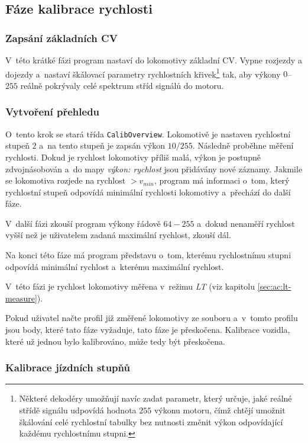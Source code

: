 \subsection{Fáze kalibrace rychlosti}

\subsubsection{Zapsání základních CV}

V~této krátké fázi program nastaví do lokomotivy základní CV. Vypne rozjezdy a
dojezdy a~nastaví škálovací parametry rychlostních křivek\footnote{Některé
dekodéry umožňují navíc zadat parametr, který určuje, jaké reálné střídě
signálu udpovídá hodnota $255$ výkonu motoru, čímž chtějí umožnit
škálování celé rychlostní tabulky bez nutnosti změnit výkon odpovídající
každému rychlostnímu stupni.} tak, aby výkony $0$--$255$ reálně pokrývaly celé
spektrum stříd signálů do motoru.

\subsubsection{Vytvoření přehledu}

O~tento krok se stará třída \texttt{CalibOverview}.
Lokomotivě je nastaven rychlostní stupeň $2$ a~na tento stupeň je zapsán výkon
$10/255$. Následně proběhne měření rychlosti. Dokud je rychlost lokomotivy
příliš malá, výkon je postupně zdvojnásobován a~do mapy \textit{výkon:
rychlost} jsou přidávány nové záznamy. Jakmile se lokomotiva rozjede na
rychlost $> v_{min}$, program má informaci o~tom, který rychlostní stupeň
odpovídá minimální rychlosti lokomotivy a~přechází do další fáze.

V~další fázi zkouší program výkony řádově $64-255$ a~dokud nenaměří rychlost
vyšší než je uživatelem zadaná maximální rychlost, zkouší dál.

Na konci této fáze má program představu o~tom, kterému rychlostnímu stupni
odpovídá minimální rychlost a~kterému maximální rychlost.

V~této fázi je rychlost lokomotivy měřena v~režimu \textit{LT} (viz kapitolu
\ref{sec:ac:lt-measure}).

Pokud uživatel načte profil již změřené lokomotivy ze souboru a~v~tomto profilu
jsou body, které tato fáze vyžaduje, tato fáze je přeskočena. Kalibrace vozidla,
které už jednou bylo kalibrováno, může tedy být přeskočena.

\subsubsection{Kalibrace jízdních stupňů}

